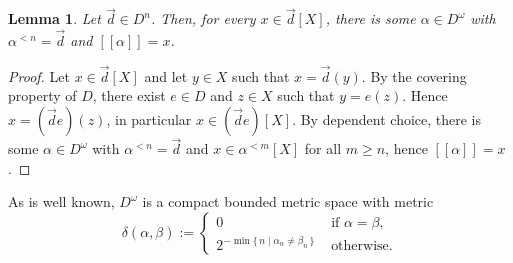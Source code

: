 \documentclass[microtype]{jloganal}
\theoremstyle{plain}
\newtheorem{lemma}[theorem]{Lemma}
\theoremstyle{definition}
\newcommand{\val}[1]{[\![#1]\!]}
\newcommand{\set}[2]{\mbox{$\{\,#1 \mid #2 \,\}$}}
\begin{document}
\begin{lemma}\label{lem-gensur}
Let $\vec{d} \in D^n$. Then, for every $x \in \vec{d}[X]$, there is some $\alpha\in D^\omega$ with $\alpha^{< n} = \vec{d}$ and $\val{\alpha} = x$.
\end{lemma}
\begin{proof}
Let $x \in \vec{d}[X]$ and let $y\in X$ such that $x= \vec{d}(y)$. 
By the covering property of $D$, there exist $e \in D$ and $z\in X$ such that $y=e(z)$.
Hence $x=(\vec{d} e)(z)$, in particular $x \in (\vec{d}e)[X]$. 
By dependent choice, there is
some $\alpha \in D^\omega$ with $\alpha^{< n} = \vec{d}$ and 
$x \in \alpha^{< m}[X]$ for all $m\ge n$, hence $\val{\alpha} = x$.
\end{proof} 

As is well known, 
$D^\omega$ is a compact bounded metric space with metric
\[
\delta(\alpha, \beta) := 
\begin{cases}
0& \text{ if $\alpha = \beta$,}\\
2^{- \min \set{n}{\alpha_n\neq \beta_n}}& \text{ otherwise.}
\end{cases}
\]
\end{document}
